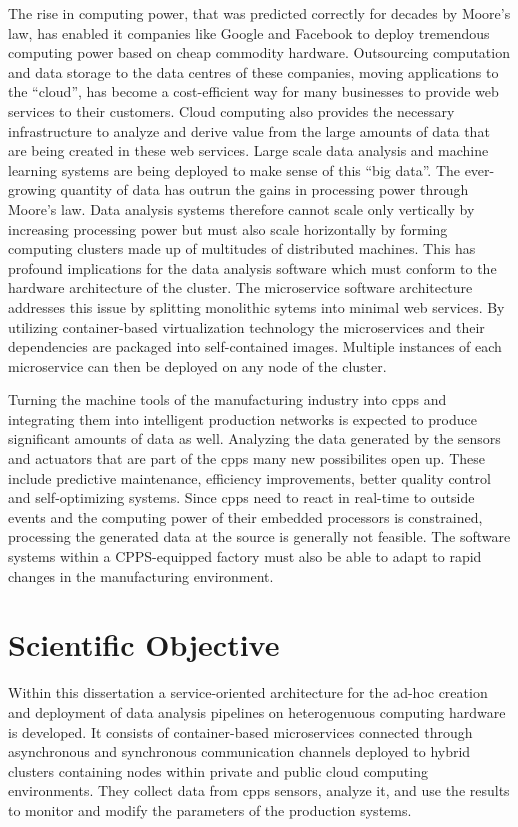 The rise in computing power, that was predicted correctly for decades by Moore's law, has enabled \ac{it} companies like Google and Facebook to deploy tremendous computing power based on cheap commodity hardware.
Outsourcing computation and data storage to the data centres of these companies, moving applications to the \enquote{cloud}, has become a cost-efficient way for many businesses to provide web services to their customers.
Cloud computing also provides the necessary infrastructure to analyze and derive value from the large amounts of data that are being created in these web services.
Large scale data analysis and machine learning systems are being deployed to make sense of this \enquote{big data}.
The ever-growing quantity of data has outrun the gains in processing power through Moore's law.
Data analysis systems therefore cannot scale only vertically by increasing processing power but must also scale horizontally by forming computing clusters made up of multitudes of distributed machines.
This has profound implications for the data analysis software which must conform to the hardware architecture of the cluster.
The microservice software architecture addresses this issue by splitting monolithic sytems into minimal web services.
By utilizing container-based virtualization technology the microservices and their dependencies are packaged into self-contained images.
Multiple instances of each microservice can then be deployed on any node of the cluster.

Turning the machine tools of the manufacturing industry into \ac{cpps} and integrating them into intelligent production networks is expected to produce significant amounts of data as well.
Analyzing the data generated by the sensors and actuators that are part of the \ac{cpps} many new possibilites open up.
These include predictive maintenance, efficiency improvements, better quality control and self-optimizing systems.
Since \ac{cpps} need to react in real-time to outside events and the computing power of their embedded processors is constrained, processing the generated data at the source is generally not feasible.
The software systems within a CPPS-equipped factory must also be able to adapt to rapid changes in the manufacturing environment.

\section{Scientific Objective}
\label{sec:scientific-objective}
Within this dissertation a service-oriented architecture for the ad-hoc creation and deployment of data analysis pipelines on heterogenuous computing hardware is developed.
It consists of container-based microservices connected through asynchronous and synchronous communication channels deployed to hybrid clusters containing nodes within private and public cloud computing environments.
They collect data from \ac{cpps} sensors, analyze it, and use the results to monitor and modify the parameters of the production systems.

